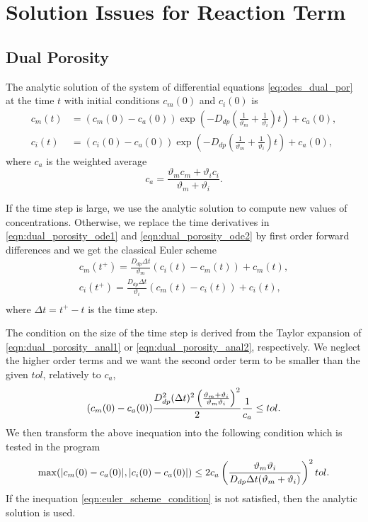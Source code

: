 \section{Solution Issues for Reaction Term}

% 

\subsection{Dual Porosity} 
\label{sec:num_dual_porosity}

The analytic solution of the system of differential equations \eqref{eq:odes_dual_por} at the time $t$ with initial conditions $c_m(0)$ and $c_i(0)$ is
\begin{align}
     c_m(t) &= (c_m(0) - c_a(0)) \exp\left(- D_{dp}\left(\frac{1}{\vartheta_m} + \frac{1}{\vartheta_i}\right) t \right) + c_a(0), 
     \label{eqn:dual_porosity_anal1}\\
     c_i(t) &= (c_i(0) - c_a(0)) \exp\left(- D_{dp}\left(\frac{1}{\vartheta_m} + \frac{1}{\vartheta_i}\right) t \right) + c_a(0),
     \label{eqn:dual_porosity_anal2}
\end{align}
where $c_a$ is the weighted average
\[
  c_a = \frac{\vartheta_m c_m + \vartheta_i c_i}{\vartheta_m + \vartheta_i}.
\]

If the time step is large, we use the analytic solution to compute new values of concentrations. 
Otherwise, we replace the time derivatives in \eqref{eqn:dual_porosity_ode1} and \eqref{eqn:dual_porosity_ode2} 
by first order forward differences and we get the classical Euler scheme
\begin{align}
  c_m(t^+) = \frac{D_{dp} \Delta t}{\vartheta_m}(c_i(t) - c_m(t)) + c_m(t), \\
  c_i(t^+) = \frac{D_{dp} \Delta t}{\vartheta_i}(c_m(t) - c_i(t)) + c_i(t), \\
\end{align}
where $\Delta t = t^+ - t$ is the time step. 

The condition on the size of the time step is derived from the Taylor expansion of 
\eqref{eqn:dual_porosity_anal1} or \eqref{eqn:dual_porosity_anal2}, respectively. We neglect the higher order 
terms and we want the second order term to be smaller than the given  
$tol$, relatively to $c_a$,
\begin{equation}
  (c_m(0) - c_a(0))
  \frac{ D_{dp}^2 (\Delta t)^2 \left(\frac{\vartheta_m + \vartheta_i}{\vartheta_m \vartheta_i}\right)^2}{2}
  \frac{1}{c_a} \leq tol. \\
\end{equation}
We then transform the above inequation into the following condition which is tested in the program
\begin{equation} \label{eqn:euler_scheme_condition}
  \max(|c_m(0) - c_a(0)|, |c_i(0) - c_a(0)|) \leq 
  2 c_a \left(\frac{\vartheta_m \vartheta_i}{D_{dp} \Delta t (\vartheta_m + \vartheta_i)}\right)^2 tol. \\
\end{equation}
If the inequation \eqref{eqn:euler_scheme_condition} is not satisfied, then the analytic 
solution is used.


